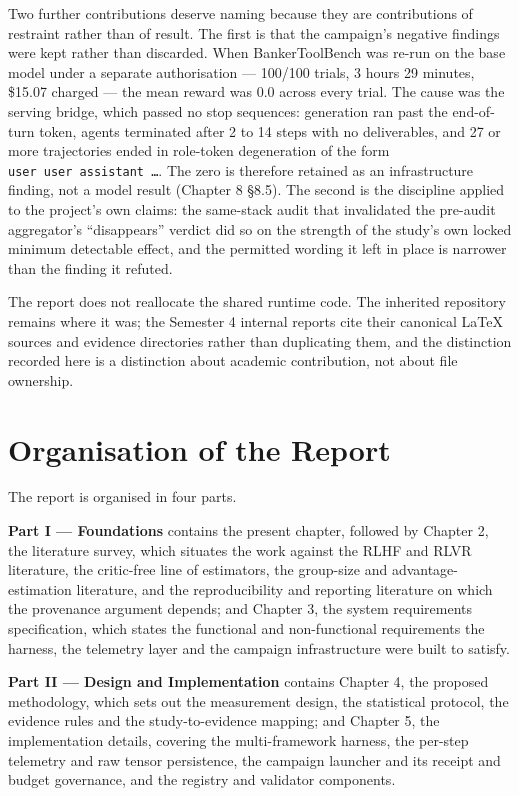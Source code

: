 \documentclass[12pt,a4paper]{report}
\begin{document}
Two further contributions deserve naming because they are contributions
of restraint rather than of result. The first is that the campaign's
negative findings were kept rather than discarded. When BankerToolBench
was re-run on the base model under a separate authorisation --- 100/100
trials, 3 hours 29 minutes, \$15.07 charged --- the mean reward was 0.0
across every trial. The cause was the serving bridge, which passed no
stop sequences: generation ran past the end-of-turn token, agents
terminated after 2 to 14 steps with no deliverables, and 27 or more
trajectories ended in role-token degeneration of the form
\texttt{user\ user\ assistant\ …}. The zero is therefore retained as an
infrastructure finding, not a model result (Chapter 8 §8.5). The second
is the discipline applied to the project's own claims: the same-stack
audit that invalidated the pre-audit aggregator's ``disappears'' verdict
did so on the strength of the study's own locked minimum detectable
effect, and the permitted wording it left in place is narrower than the
finding it refuted.

The report does not reallocate the shared runtime code. The inherited
repository remains where it was; the Semester 4 internal reports cite
their canonical LaTeX sources and evidence directories rather than
duplicating them, and the distinction recorded here is a distinction
about academic contribution, not about file ownership.

\section{Organisation of the Report}\label{organisation-of-the-report}

The report is organised in four parts.

\textbf{Part I --- Foundations} contains the present chapter, followed
by Chapter 2, the literature survey, which situates the work against the
RLHF and RLVR literature, the critic-free line of estimators, the
group-size and advantage-estimation literature, and the reproducibility
and reporting literature on which the provenance argument depends; and
Chapter 3, the system requirements specification, which states the
functional and non-functional requirements the harness, the telemetry
layer and the campaign infrastructure were built to satisfy.

\textbf{Part II --- Design and Implementation} contains Chapter 4, the
proposed methodology, which sets out the measurement design, the
statistical protocol, the evidence rules and the study-to-evidence
mapping; and Chapter 5, the implementation details, covering the
multi-framework harness, the per-step telemetry and raw tensor
persistence, the campaign launcher and its receipt and budget
governance, and the registry and validator components.
\end{document}
